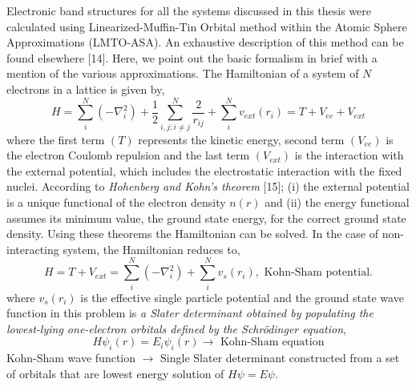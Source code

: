 Electronic band structures for all the systems discussed in this thesis were calculated using Linearized-Muffin-Tin Orbital method within the Atomic Sphere Approximations (LMTO-ASA). An exhaustive description of this method can be found elsewhere [14]. Here, we point out the basic formalism in brief with a mention of the various approximations. The Hamiltonian of a system of $N$ electrons in a lattice is given by,
\begin{equation*}
H=\sum\limits^{N}_{i}(-\nabla^{2}_{i})+\frac{1}{2}\sum\limits^{N}_{i,j;i\neq j}\dfrac{2}{r_{ij}}+\sum\limits^{N}_{i}v_{ext}(r_{i})=T+V_{ee}+V_{ext}\tag{2.10}
\end{equation*}
where the first term $(T)$ represents the kinetic energy, second term $(V_{ee})$ is the electron Coulomb repulsion and the last term $(V_{ext})$ is the interaction with the external potential, which includes the electrostatic interaction with the fixed nuclei. According to {\em Hohenberg and Kohn's theorem} [15]; (i) the external potential is a unique functional of the electron density $n(r)$ and (ii) the energy functional assumes its minimum value, the ground state energy, for the correct ground state density. Using these theorems the Hamiltonian can be solved. In the case of non-interacting system, the Hamiltonian reduces to,
\begin{equation*}
H=T+V_{ext}=\sum\limits^{N}_{i}(-\nabla^{2}_{i})+\sum\limits^{N}_{i}v_{s}(r_{i}), \text{ Kohn-Sham potential.}
\end{equation*}
where $v_{s}(r_{i})$ is the effective single particle potential and the ground state wave function in this problem is {\em a Slater determinant obtained by populating the lowest-lying one-electron orbitals defined by the Schr\"odinger equation},
$$
H\psi_{i}(r)=E_{i}\psi_{i}(r)\to \text{ Kohn-Sham equation}
$$
Kohn-Sham wave function $\to$ Single Slater determinant constructed from a set of orbitals that are lowest energy solution of $H\psi=E\psi$.

